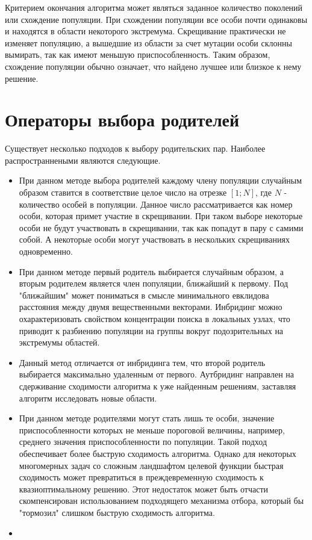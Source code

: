 Критерием окончания алгоритма может являться заданное количество поколений или схождение популяции.
При схождении популяции все особи почти одинаковы и находятся в области некоторого экстремума. Скрещивание практически не изменяет популяцию, а вышедшие из области за счет мутации особи склонны вымирать, так как имеют меньшую приспособленность. Таким образом, схождение популяции обычно означает, что найдено лучшее или близкое к нему решение.

\section{Операторы выбора родителей}
Существует несколько подходов к выбору родительских пар. Наиболее распространнеными являются следующие.
\begin{itemize}[label=$\ast$]
	\item {}

При данном методе выбора родителей каждому члену популяции случайным образом ставится в соответствие целое число на отрезке $[1; N]$, где $N$ - количество особей в популяции. Данное число рассматривается как номер особи, которая примет участие в скрещивании. При таком выборе некоторые особи не будут участвовать в скрещивании, так как попадут в пару с самими собой. А некоторые особи могут участвовать в нескольких скрещиваниях одновременно.
	\item {}

При данном методе первый родитель выбирается случайным образом, а вторым родителем является член популяции, ближайший к первому. Под "ближайшим" может пониматься в смысле минимального евклидова расстояния между двумя вещественными векторами.
Инбридинг можно охарактеризовать свойством концентрации поиска в локальных узлах, что приводит к разбиению популяции на группы вокруг подозрительных на экстремумы областей.
	\item {}

Данный метод отличается от инбридинга тем, что второй родитель выбирается максимально удаленным от первого.
Аутбридинг направлен на сдерживание сходимости алгоритма к уже найденным решениям, заставляя алгоритм исследовать новые области.
	\item {}

При данном методе родителями могут стать лишь те особи, значение приспособленности которых не меньше пороговой величины, например, среднего значения приспособленности по популяции. Такой подход обеспечивает более быструю сходимость алгоритма. Однако для некоторых многомерных задач со сложным ландшафтом целевой функции быстрая сходимость может превратиться в преждевременную сходимость к квазиоптимальному решению. Этот недостаток может быть отчасти скомпенсирован использованием подходящего механизма отбора, который бы "тормозил" слишком быструю сходимость алгоритма.
	\item {}


\end{itemize}
